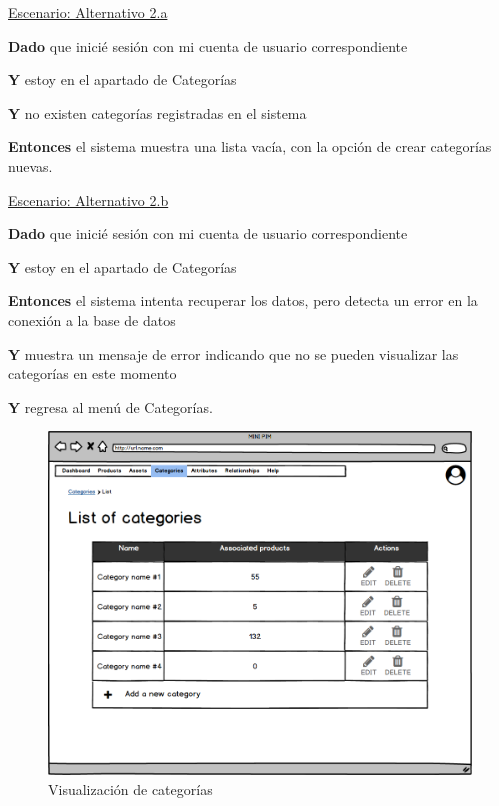 \vspace{0.20cm}

\underline{Escenario: Alternativo 2.a}\par
\vspace{0.15cm}

\textbf{Dado} que inicié sesión con mi cuenta de usuario correspondiente\par
\textbf{Y} estoy en el apartado de Categorías\par
\textbf{Y} no existen categorías registradas en el sistema\par
\textbf{Entonces} el sistema muestra una lista vacía, con la opción de crear categorías nuevas.\par


\vspace{0.20cm}

\underline{Escenario: Alternativo 2.b}\par
\vspace{0.15cm}

\textbf{Dado} que inicié sesión con mi cuenta de usuario correspondiente\par
\textbf{Y} estoy en el apartado de Categorías\par
\textbf{Entonces} el sistema intenta recuperar los datos, pero detecta un error en la conexión a la base de datos\par
\textbf{Y} muestra un mensaje de error indicando que no se pueden visualizar las categorías en este momento\par
\textbf{Y} regresa al menú de Categorías.\par

\vspace{0.20cm}

\begin{figure}[H]
    \includegraphics[width=1\linewidth]{mockups/RF4.2_1.png}
    \caption{Visualización de categorías}
   \end{figure}
\vspace{1.0cm}

